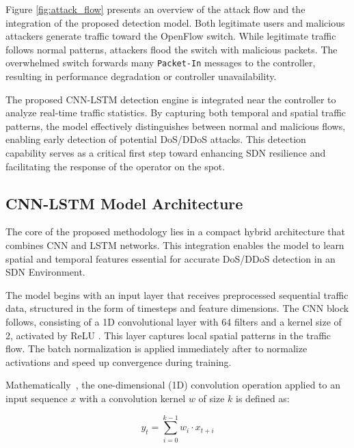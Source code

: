 \documentclass[ASNA,twocolumn]{USG} %
\begin{document}
Figure \ref{fig:attack_flow} presents an overview of the attack flow and the integration of the proposed detection model. Both legitimate users and malicious attackers generate traffic toward the OpenFlow switch. While legitimate traffic follows normal patterns, attackers flood the switch with malicious packets. The overwhelmed switch forwards many \texttt{Packet-In} messages to the controller, resulting in performance degradation or controller unavailability.

The proposed CNN-LSTM detection engine is integrated near the controller to analyze real-time traffic statistics. By capturing both temporal and spatial traffic patterns, the model effectively distinguishes between normal and malicious flows, enabling early detection of potential DoS/DDoS attacks. This detection capability serves as a critical first step toward enhancing SDN resilience and facilitating the response of the operator on the spot.





\subsection{CNN-LSTM Model Architecture}

The core of the proposed methodology lies in a compact hybrid architecture that combines CNN and LSTM networks. This integration enables the model to learn spatial and temporal features essential for accurate DoS/DDoS detection in an SDN Environment.

The model begins with an input layer that receives preprocessed sequential traffic data, structured in the form of timesteps and feature dimensions. The CNN block follows, consisting of a 1D convolutional layer with 64 filters and a kernel size of 2, activated by ReLU \cite{qazi2022one}. This layer captures local spatial patterns in the traffic flow. The batch normalization is applied immediately after to normalize activations and speed up convergence during training.

Mathematically~\cite{koushik2016understanding, cacciari2024hands}, the one-dimensional (1D) convolution operation applied to an input sequence $x$ with a convolution kernel $w$ of size $k$ is defined as:

\begin{equation}
y_t = \sum_{i=0}^{k-1} w_i \cdot x_{t+i}
\label{eq:conv1d}
\end{equation}
\end{document}
